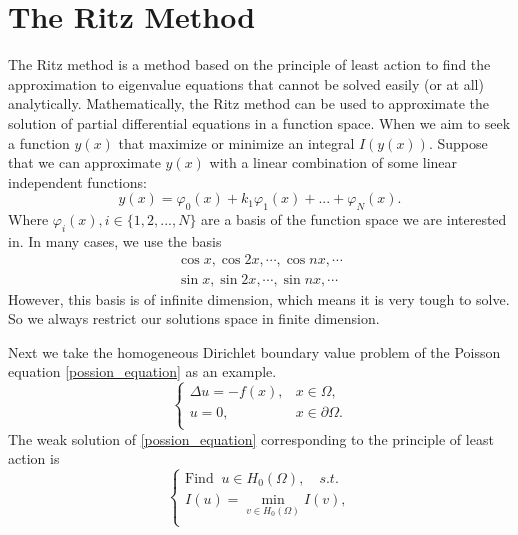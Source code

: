 \documentclass{article}
\begin{document}
\section{The Ritz Method}
\par The Ritz method \cite{evans1998partial} is a method based on the principle of least action to find the approximation to eigenvalue equations that cannot be solved easily (or at all) analytically. Mathematically, the Ritz method can be used to approximate the solution of partial differential equations in a function space. When we aim to seek a function $y(x)$ that maximize or minimize an integral $I(y(x))$. Suppose that we can approximate $y(x)$ with a linear combination of some linear independent functions:
\begin{equation}
	y(x)=\varphi_0(x)+k_1\varphi_1(x)+...+\varphi_N(x).
\end{equation}
Where $\varphi_{i}(x),i\in\{1,2,...,N\}$ are a basis of the function space we are interested in. In many cases, we use the basis 
\begin{equation}
	\begin{aligned}
		\cos x, \cos 2x, \cdots, \cos nx, \cdots\\
		\sin x, \sin 2x, \cdots, \sin nx, \cdots
	\end{aligned}
\end{equation}
However, this basis is of infinite dimension, which means it is very tough to solve. So we always restrict our solutions space in finite dimension.
\par Next we take the homogeneous Dirichlet boundary value problem of the Poisson equation \eqref{possion_equation} as an example.
\begin{equation}\label{possion_equation}
	\begin{cases}
 		\Delta u=-f(x), & x\in \Omega, \\
 		u=0, & x\in \partial \Omega. \\
 	\end{cases}
\end{equation}
The weak solution of \eqref{possion_equation} corresponding to the principle of least action is
\begin{equation}\label{variational problem}
	\begin{cases}
 		\text{Find }\ u\in H_{0}(\Omega),\quad s.t.\\
 		I(u)=\min\limits_{v\in H_{0}(\Omega)} I(v),\\
  	\end{cases}
\end{equation}
\end{document}
